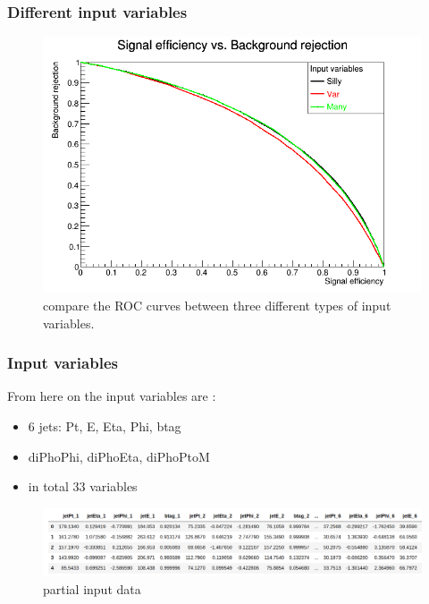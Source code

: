 \documentclass{beamer}
\begin{document}
\begin{frame}
\frametitle{Different input variables}
\begin{figure}
\includegraphics[scale=0.25]{./figures/ROC_Curve3.png}
\caption{compare the ROC curves between three different types of input variables.}
\end{figure}
\end{frame}

\begin{frame}
\frametitle{Input variables}
From here on the input variables are :
\begin{itemize}
\item 6 jets: Pt,  E,  Eta, Phi, btag
\item diPhoPhi, diPhoEta, diPhoPtoM
\item in total 33 variables
\end{itemize}
\begin{figure}
\includegraphics[scale=0.25]{./figures/input.png}
\caption{partial input data}
\end{figure}
\end{frame}
\end{document}
